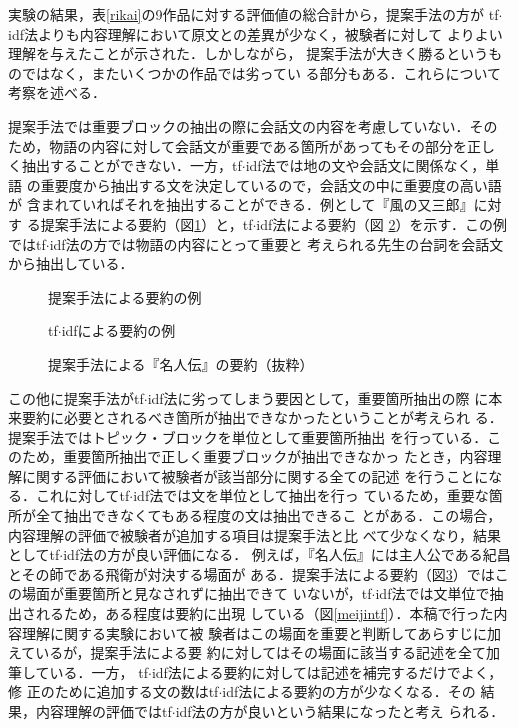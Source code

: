 \documentclass[japanese]{jnlp_1.4}
\begin{document}
 実験の結果，表\ref{rikai}の9作品に対する評価値の総合計から，提案手法の方が
 tf$\cdot$idf法よりも内容理解において原文との差異が少なく，被験者に対して
 よりよい理解を与えたことが示された．しかしながら，
 提案手法が大きく勝るというものではなく，またいくつかの作品では劣ってい
 る部分もある．これらについて考察を述べる．

 提案手法では重要ブロックの抽出の際に会話文の内容を考慮していない．その
 ため，物語の内容に対して会話文が重要である箇所があってもその部分を正し
 く抽出することができない．一方，tf$\cdot$idf法では地の文や会話文に関係なく，単語
 の重要度から抽出する文を決定しているので，会話文の中に重要度の高い語が
 含まれていればそれを抽出することができる．例として『風の又三郎』に対す
 る提案手法による要約（図\ref{teianrei}）と，tf$\cdot$idf法による要約（図
 \ref{tfidfrei}）を示す．この例ではtf$\cdot$idf法の方では物語の内容にとって重要と
 考えられる先生の台詞を会話文から抽出している．

 \begin{figure}[b]

\vspace{-1\baselineskip}
\caption{提案手法による要約の例}\label{teianrei}
 \end{figure}
 \begin{figure}[b]
 
\vspace{-1\baselineskip}
\caption{tf$\cdot$idfによる要約の例}\label{tfidfrei}
 \end{figure}
 \begin{figure}[b]
 
\vspace{-1\baselineskip}
\caption{提案手法による『名人伝』の要約（抜粋）}\label{meijintei}
 \end{figure}


 この他に提案手法がtf$\cdot$idf法に劣ってしまう要因として，重要箇所抽出の際
 に本来要約に必要とされるべき箇所が抽出できなかったということが考えられ
 る．提案手法ではトピック・ブロックを単位として重要箇所抽出
 を行っている．このため，重要箇所抽出で正しく重要ブロックが抽出できなかっ
 たとき，内容理解に関する評価において被験者が該当部分に関する全ての記述
 を行うことになる．これに対してtf$\cdot$idf法では文を単位として抽出を行っ
 ているため，重要な箇所が全て抽出できなくてもある程度の文は抽出できるこ
 とがある．この場合，内容理解の評価で被験者が追加する項目は提案手法と比
 べて少なくなり，結果としてtf$\cdot$idf法の方が良い評価になる．
 例えば，『名人伝』には主人公である紀昌とその師である飛衛が対決する場面が
 ある．提案手法による要約（図\ref{meijintei}）ではこの場面が重要箇所と見なされずに抽出できて
 いないが，tf$\cdot$idf法では文単位で抽出されるため，ある程度は要約に出現
 している（図\ref{meijintf}）．本稿で行った内容理解に関する実験において被
 験者はこの場面を重要と判断してあらすじに加えているが，提案手法による要
 約に対してはその場面に該当する記述を全て加筆している．一方，
 tf$\cdot$idf法による要約に対しては記述を補完するだけでよく，修
 正のために追加する文の数はtf$\cdot$idf法による要約の方が少なくなる．その
 結果，内容理解の評価ではtf$\cdot$idf法の方が良いという結果になったと考え
 られる．
\end{document}
